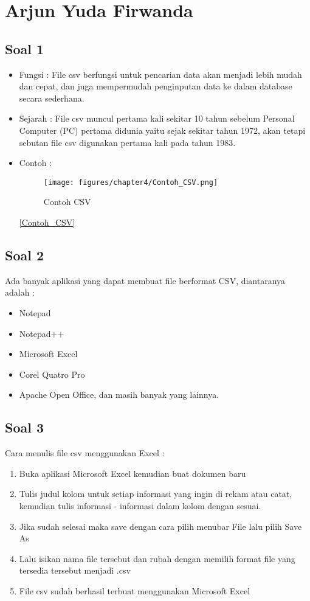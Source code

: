 \section{Arjun Yuda Firwanda}
	\subsection{Soal 1}
		\begin{itemize}
			\item Fungsi : File csv berfungsi untuk pencarian data akan menjadi lebih mudah dan cepat, dan juga mempermudah penginputan data ke dalam database secara sederhana.
			\item Sejarah : File csv muncul pertama kali sekitar 10 tahun sebelum Personal Computer (PC) pertama  didunia yaitu sejak sekitar tahun 1972, akan tetapi sebutan file csv digunakan pertama kali pada tahun 1983.
			\item Contoh : 
				\begin{figure} [ht]
					\centerline{\texttt{[image: figures/chapter4/Contoh\_CSV.png]}}
					\caption{Contoh CSV}
					\label{Contoh CSV}
				\end{figure}

			\ref{Contoh_CSV}
		\end{itemize}
	
	\subsection{Soal 2}
	Ada banyak aplikasi yang dapat membuat file berformat CSV, diantaranya adalah :
		\begin{itemize}
			\item Notepad
			\item Notepad++
			\item Microsoft Excel
			\item Corel Quatro Pro
			\item Apache Open Office, dan masih banyak yang lainnya.
		\end{itemize}
		
	\subsection{Soal 3}
	Cara menulis file csv menggunakan Excel :
		\begin{enumerate}
			\item Buka aplikasi Microsoft Excel kemudian buat dokumen baru
			\item Tulis judul kolom untuk setiap informasi yang ingin di rekam atau catat, kemudian tulis informasi - informasi dalam kolom dengan sesuai.
			\item Jika sudah selesai maka save dengan cara pilih menubar File lalu pilih Save As
			\item Lalu isikan nama file tersebut dan rubah dengan memilih format file yang tersedia tersebut menjadi .csv
			\item File csv sudah berhasil terbuat menggunakan Microsoft Excel
		\end{enumerate}
				
